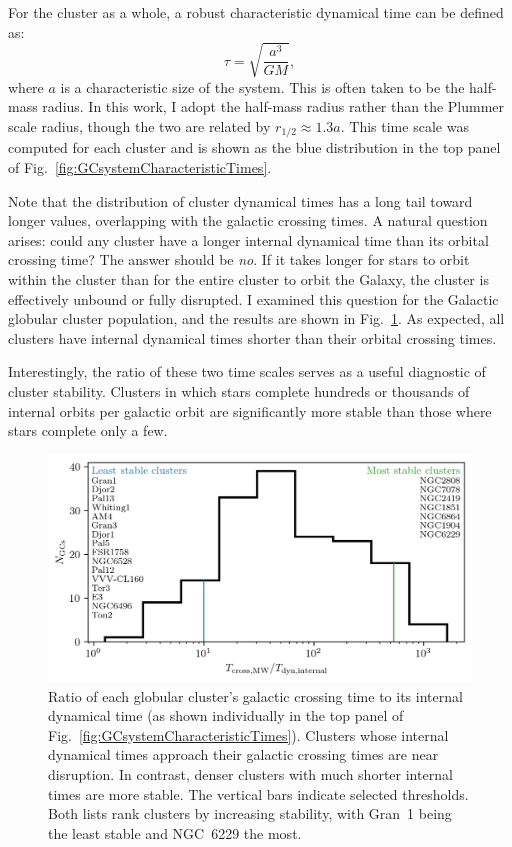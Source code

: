         For the cluster as a whole, a robust characteristic dynamical time can be defined as:
        \begin{equation}
            \tau = \sqrt{\frac{a^3}{GM}},
        \end{equation}
        where \( a \) is a characteristic size of the system. This is often taken to be the half-mass radius. In this work, I adopt the half-mass radius rather than the Plummer scale radius, though the two are related by \( r_{\mathrm{1/2}} \approx 1.3a \). This time scale was computed for each cluster and is shown as the blue distribution in the top panel of Fig.~\ref{fig:GCsystemCharacteristicTimes}.

        Note that the distribution of cluster dynamical times has a long tail toward longer values, overlapping with the galactic crossing times. A natural question arises: could any cluster have a longer internal dynamical time than its orbital crossing time? The answer should be \textit{no}. If it takes longer for stars to orbit within the cluster than for the entire cluster to orbit the Galaxy, the cluster is effectively unbound or fully disrupted. I examined this question for the Galactic globular cluster population, and the results are shown in Fig.~\ref{fig:GCsystemStabilityDynamicalTimeRatios}. As expected, all clusters have internal dynamical times shorter than their orbital crossing times.

        Interestingly, the ratio of these two time scales serves as a useful diagnostic of cluster stability. Clusters in which stars complete hundreds or thousands of internal orbits per galactic orbit are significantly more stable than those where stars complete only a few. 
        \begin{figure}
            \centering
            \includegraphics[width=\linewidth]{images/GCsystemStabilityDynamicalTimeRatios.png}
            \caption{Ratio of each globular cluster's galactic crossing time to its internal dynamical time (as shown individually in the top panel of Fig.~\ref{fig:GCsystemCharacteristicTimes}). Clusters whose internal dynamical times approach their galactic crossing times are near disruption. In contrast, denser clusters with much shorter internal times are more stable. The vertical bars indicate selected thresholds. Both lists rank clusters by increasing stability, with Gran~1 being the least stable and NGC~6229 the most.}
            \label{fig:GCsystemStabilityDynamicalTimeRatios}
        \end{figure}
        
